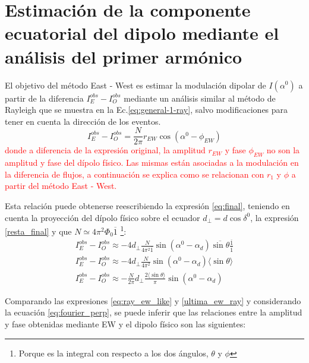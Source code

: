 \section{Estimación de la componente ecuatorial del dipolo mediante el análisis del  primer armónico}


El objetivo del método  East - West es estimar la modulación dipolar de  $I(\alpha^0)$ a partir de la diferencia $I^{obs}_E -  I^{obs}_O$ mediante un análisis similar al método de  Rayleigh que se muestra en la Ec.\ref{eq:general-1-ray}, salvo modificaciones para tener en cuenta la dirección de los eventos. 
\begin{equation}
    I^{obs}_E -  I^{obs}_O = \frac{N}{2\pi} r_{EW} \cos(\alpha^0 -  \phi_{EW}) \label{eq:ray_ew_like}
\end{equation}
\textcolor{red}{donde a diferencia de la expresión original, la amplitud $r_{EW}$ y fase $\phi_{EW}$ no son la amplitud y fase del dípolo físico. Las mismas están asociadas a la modulación en la diferencia de flujos, a continuación se explica como se relacionan con $r_1$ y $\phi$  a partir del   método East - West.}


Esta relación puede obtenerse reescribiendo la expresión \ref{eq:final}, teniendo en cuenta la proyección del dípolo físico sobre el ecuador $d_{\perp}= d\cos\delta^0$, la expresión  \ref{resta_final} y que $N \simeq 4\pi^2 \Phi_0 \overline{1} $ \footnote{Porque es la integral con respecto a los dos ángulos, $\theta$ y $\phi$}:
\begin{align}
    I^{obs}_E -  I^{obs}_O \approx -4 d_\perp \frac{N}{ 4\pi^2\overline{1}} \sin(\alpha^0  - \alpha_d)\overline{\sin\theta} \frac{\overline{1}}{\overline{1}}\\
    I^{obs}_E -  I^{obs}_O \approx -4 d_\perp \frac{N}{ 4\pi^2} \sin(\alpha^0  - \alpha_d)\langle\sin\theta \rangle\\
    I^{obs}_E -  I^{obs}_O \approx -\frac{N}{2\pi} d_\perp \frac{2\langle\sin\theta \rangle }{\pi}\sin(\alpha^0  - \alpha_d) \label{ultima_ew_ray}
\end{align}


Comparando las expresiones \ref{eq:ray_ew_like} y \ref{ultima_ew_ray} y considerando la ecuación \ref{eq:fourier_perp}, se puede inferir que las relaciones entre la amplitud y fase obtenidas mediante EW y el dipolo físico son las siguientes:

